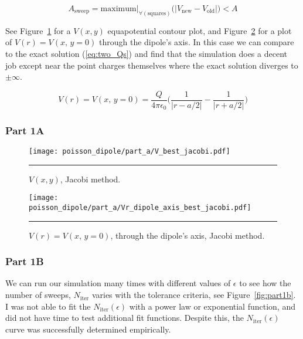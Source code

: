 \documentclass[notitlepage,aps,prd,nofootinbib]{revtex4-1}
\begin{document}
\begin{equation} \label{eq:A_def} 
A_{\mathrm{sweep}} = \mathrm{maximum}|_{\forall (\mathrm{squares})} \bigg(\left|V_{\mathrm{new}} - V_{\mathrm{old}}\right|\bigg) < A
\end{equation}

See Figure~\ref{fig:part1a_V} for a $V\left(x, y\right)$ equapotential contour plot, and Figure~\ref{fig:part1a_Vr} for a plot of $V\left(r\right) = V\left(x,\,y=0\right)$ through the dipole's axis. In this case we can compare to the exact solution (\ref{eq:two_Qs}) and find that the simulation does a decent job except near the point charges themselves where the exact solution diverges to $\pm \infty$.

\begin{equation} \label{eq:two_Qs} 
V\left(r\right) = V\left(x,\,y=0\right) = \frac{Q}{4 \pi \epsilon_{0}} \bigg( \frac{1}{\left|r-a/2\right|} - \frac{1}{\left|r+a/2\right|} \bigg)
\end{equation}

\clearpage
\subsubsection{Part 1A}
\label{subsubsec:part_1a}

\begin{figure}[!htbc]
  \centering
  \texttt{[image: poisson\_dipole/part\_a/V\_best\_jacobi.pdf]}
	{\par\nobreak\rule[9pt]{35em}{0.5pt}\vspace{-5mm}}
	\caption{$V\left(x, y\right)$, Jacobi method.}
	\label{fig:part1a_V}
\end{figure}

\begin{figure}[!htbc]
  \centering
  \texttt{[image: poisson\_dipole/part\_a/Vr\_dipole\_axis\_best\_jacobi.pdf]}
	{\par\nobreak\rule[9pt]{35em}{0.5pt}\vspace{-5mm}}
	\caption{$V\left(r\right) = V\left(x,\,y=0\right)$, through the dipole's axis, Jacobi method.}
	\label{fig:part1a_Vr}
\end{figure}

\clearpage
\subsubsection{Part 1B}
\label{subsubsec:part_1b}

We can run our simulation many times with different values of $\epsilon$ to see how the number of sweeps, $N_{\mathrm{iter}}$ varies with the tolerance criteria, see Figure~\ref{fig:part1b}. I was not able to fit the $N_{\mathrm{iter}}\left(\epsilon\right)$ with a power law or exponential function, and did not have time to test additional fit functions. Despite this, the $N_{\mathrm{iter}}\left(\epsilon\right)$ curve was successfully determined empirically.
\end{document}
